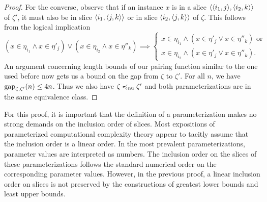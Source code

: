 \begin{proof}
  For the converse, observe that if an instance $x$ is in a slice ${\langle {\langle i_1, j\rangle}, {\langle i_2, k\rangle}\rangle}$ of $\zeta'$, it must also be in slice ${\langle i_1, {\langle j, k\rangle}\rangle}$ or in slice ${\langle i_2, {\langle j, k\rangle}\rangle}$ of $\zeta$.
  This follows from the logical implication
  \begin{equation*}
    (x \in \eta_{i_1} \land x \in \eta'_j) \lor (x \in \eta_{i_2} \land x \in \eta''_k) \implies \begin{cases}
      x \in \eta_{i_1} \land (x \in \eta'_j \lor x \in \eta''_k)\text{ or} \\
      x \in \eta_{i_2} \land (x \in \eta'_j \lor x \in \eta''_k).
    \end{cases}
  \end{equation*}
  An argument concerning length bounds of our pairing function similar to the one used before now gets us a bound on the gap from $\zeta$ to $\zeta'$.
  For all $n$, we have $\operatorname{gap}_{\zeta, \zeta'}(n) \le 4n$.
  Thus we also have $\zeta \preccurlyeq_\mathrm{nu} \zeta'$ and both parameterizations are in the same equivalence class.
\end{proof}

For this proof, it is important that the definition of a parameterization makes no strong demands on the inclusion order of slices.
Most expositions of parameterized computational complexity theory appear to tacitly assume that the inclusion order is a linear order.
In the most prevalent parameterizations, parameter values are interpreted as numbers.
The inclusion order on the slices of these parameterizations follows the standard numerical order on the corresponding parameter values.
However, in the previous proof, a linear inclusion order on slices is not preserved by the constructions of greatest lower bounds and least upper bounds.

